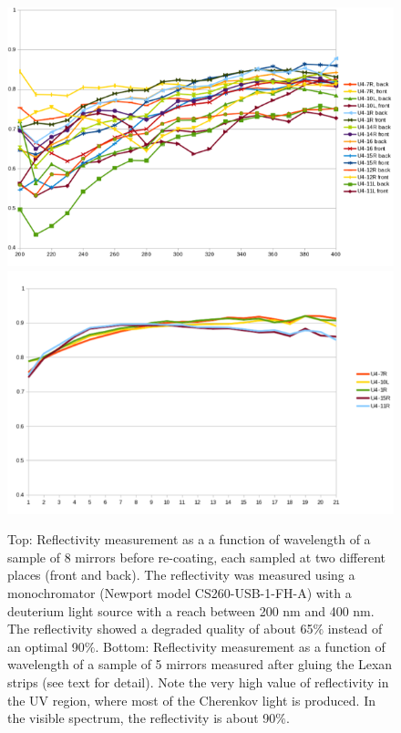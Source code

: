 \begin{figure}[h]
\centering
	\includegraphics[width=0.95\columnwidth,keepaspectratio]{img/mirrorsReflectivityBefore.png}
	\includegraphics[width=0.95\columnwidth,keepaspectratio]{img/mirrorsReflectivityAfter.png}
	\caption{Top: Reflectivity measurement as a a function of wavelength of a sample of 8 mirrors before re-coating,
            each sampled at two different places (front and back). The reflectivity
				was measured using a monochromator (Newport model CS260-USB-1-FH-A) with a deuterium light source with a reach
            between 200 nm and 400 nm. The reflectivity showed a degraded quality of about 65$\%$ instead of an optimal 90$\%$.
			   Bottom: Reflectivity measurement as a function of wavelength of a sample of 5 mirrors measured after gluing the Lexan strips (see text for detail).
            Note the very high value of reflectivity in the UV region, where most of the Cherenkov light is produced. In the visible spectrum,
            the reflectivity is about 90$\%$.}
	\label{fig:reflectivityBeforeAndAfter}
\end{figure}



